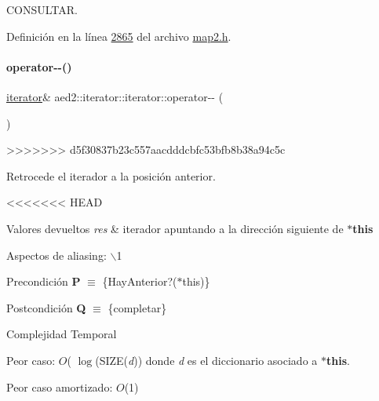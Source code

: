 C\+O\+N\+S\+U\+L\+T\+AR. 

Definición en la línea \hyperlink{map2_8h_source_l02865}{2865} del archivo \hyperlink{map2_8h_source}{map2.\+h}.

\mbox{\label{classaed2_1_1iterator_1_1iterator_a260692ee1d51f87ef547b4a798fc2de5_a260692ee1d51f87ef547b4a798fc2de5}} 
\paragraph{\texorpdfstring{operator-\/-\/()}{operator--()}\hspace{0.1cm}{\footnotesize\ttfamily [1/2]}}
{\footnotesize\ttfamily \hyperlink{classaed2_1_1iterator_1_1iterator}{iterator}\& aed2\+::iterator\+::iterator\+::operator-\/-\/ (\begin{DoxyParamCaption}{ }\end{DoxyParamCaption})\hspace{0.3cm}{\ttfamily [inline]}}
>>>>>>> d5f30837b23c557aacdddcbfc53bfb8b38a94c5c



Retrocede el iterador a la posición anterior. 

<<<<<<< HEAD
\begin{DoxyRetVals}{\-Valores devueltos}
{\em res} & iterador apuntando a la dirección siguiente de {\bfseries $\ast$this}\\
\hline
\end{DoxyRetVals}
\begin{DoxyParagraph}{\-Aspectos de aliasing\-:}
$\backslash$1
\end{DoxyParagraph}
\begin{DoxyPrecond}{\-Precondición}
{\bfseries \-P} $\equiv$ \{\-Hay\-Anterior?($\ast$this)\} 
\end{DoxyPrecond}
\begin{DoxyPostcond}{\-Postcondición}
{\bfseries \-Q} $\equiv$ \{completar\}
\end{DoxyPostcond}

\begin{DoxyDescription}
\item[\-Complejidad \-Temporal]
\begin{DoxyItemize}
\item \-Peor caso\-: $O$( $\log$(\-S\-I\-Z\-E({\itshape d\/})) donde {\itshape d\/} es el diccionario asociado a {\bfseries $\ast$this}.
\item \-Peor caso amortizado\-: $O$(1) 
\end{DoxyItemize}
\end{DoxyDescription}

